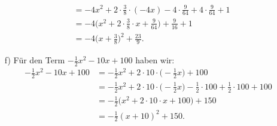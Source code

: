 \documentclass[12pt]{article}
\begin{document}
\begin{solution}
\begin{enumerate}
\begin{equation*}
\begin{split}
					 & = -4x^{2}+2\cdot \frac{3}{8}\cdot (-4x)-4\cdot \frac{9}{64}+4\cdot \frac{9}{64}+1\\
					 & = -4\bigg(x^{2}+2\cdot \frac{3}{8}\cdot x+\frac{9}{64}\bigg)+\frac{9}{16}+1\\
					 & = -4\bigg(x+\frac{3}{8}\bigg)^{2}+\frac{23}{9}.
\end{split}
\end{equation*}
\item[f)] Für den Term $-\frac{1}{2}x^{2}-10x+100$ haben wir:
\begin{equation*}
\begin{split}
-\frac{1}{2}x^{2}-10x+100& =-\frac{1}{2} x^{2}+2\cdot 10\cdot \bigg(-\frac{1}{2}x\bigg)+100\\
					 & =- \frac{1}{2}x^{2}+2\cdot 10\cdot \bigg(-\frac{1}{2}x\bigg)-\frac{1}{2}\cdot 100+\frac{1}{2}\cdot 100+100\\
					 & =- \frac{1}{2}\bigg(x^{2}+2\cdot 10\cdot x+ 100\bigg)+150\\
					 & = -\frac{1}{2}(x+10)^{2}+150.
\end{split}
\end{equation*}
\end{enumerate}
\end{solution}
\end{document}
